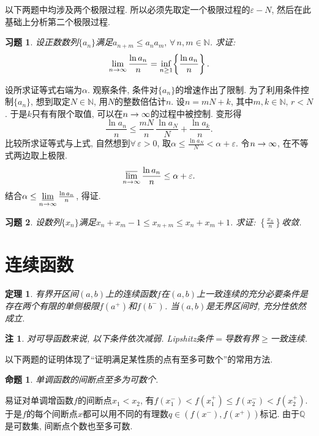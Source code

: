 \documentclass[11pt,a4paper]{ctexart}
\makeatletter
\theoremstyle{thmseries} %
\newtheorem{thm}{定理}[section]
\newtheorem{prop}{命题}[section]
\theoremstyle{exerseries}
\newtheorem{exer}{习题}[section]
\newtheorem*{rem}{注}
\renewenvironment{proof}[1][\proofname]{\par
  \pushQED{\qed}%
  \normalfont \topsep6\p@\@plus6\p@\relax
  \trivlist
  \item[\hskip\labelsep
        \itshape
    #1\@addpunct{}]\ignorespaces
}{%
  \popQED\endtrivlist\@endpefalse
}
\newenvironment{pf}{\begin{proof}[\bfseries\upshape 证\quad]}{\end{proof}}
\newcommand{\bra}[1]{\mathopen{}\left(#1\right)}
\newcommand{\cbra}[1]{\mathopen{}\left\{#1\right\}}
\renewcommand{\epsilon}{\varepsilon}
\newcommand{\N}{\mathbb{N}}
\newcommand{\Q}{\mathbb{Q}}
\DeclareMathOperator{\llim}{\underset{\nti}{\underline{\lim}}}
\DeclareMathOperator{\ulim}{\underset{\nti}{\overline{\lim}}}
\def \nti {\mathnormal{n}\to\infty}
\makeatother
\begin{document}
以下两题中均涉及两个极限过程. 所以必须先取定一个极限过程的$\epsilon-N$, 然后在此基础上分析第二个极限过程. 
\begin{exer}
	设正数数列$\{a_n\}$满足$a_{n+m}\leq a_na_m,\,\forall\,n,m\in\N$. 求证:
	\[\lim_{\nti}\frac{\ln a_n}{n}=\inf_{n\geq 1}\cbra{\frac{\ln a_n}{n}}.\]
\end{exer}
\begin{pf}
	设所求证等式右端为$\alpha$. 观察条件, 条件对$\{a_n\}$的增速作出了限制. 为了利用条件控制$\{a_n\}$, 想到取定$N\in\N$, 用$N$的整数倍估计$n$. 设$n=mN+k$, 其中$m,k\in\N,\,r<N$. 于是$k$只有有限个取值, 可以在$\nti$的过程中被控制. 变形得
	\[\frac{\ln a_n}{n}\leq\frac{mN}{n}\,\frac{\ln a_N}{N}+\frac{\ln a_k}{n}.\]
	比较所求证等式与上式, 自然想到$\forall\,\epsilon>0$, 取$\alpha\leq\frac{\ln a_N}{N}<\alpha+\epsilon.$
	令$\nti$, 在不等式两边取上极限. 
	\[\ulim\frac{\ln a_n}{n}\leq\alpha+\epsilon.\]
	结合$\alpha\leq\llim\frac{\ln a_n}{n}$, 得证. 
\end{pf}

\begin{exer}
	设数列$\{x_n\}$满足$x_n+x_m-1\leq x_{n+m}\leq x_n+x_m+1$. 求证: $\cbra{\frac{x_n}{n}}$收敛. 
\end{exer}


\section{连续函数}
\begin{thm}
	有界开区间$(a,b)$上的连续函数$f$在$(a,b)$上一致连续的充分必要条件是存在两个有限的单侧极限$f(a^+)$和$f(b^-)$. 当$(a,b)$是无界区间时, 充分性依然成立. 
\end{thm}
\begin{rem}
	对可导函数来说, 以下条件依次减弱. Lipshitz条件$=$导数有界$\geq$一致连续. 
\end{rem}


以下两题的证明体现了``证明满足某性质的点有至多可数个''的常用方法. 
\begin{prop}
	单调函数的间断点至多为可数个. 
\end{prop}
\begin{pf}
	易证对单调增函数$f$的间断点$x_1<x_2$, 有$f(x_1^-)<f(x_1^+)\leq f(x_2^-)<f(x_2^+)$. 于是$f$的每个间断点$x$都可以用不同的有理数$q\in\bra{f(x^-),f(x^+)}$标记. 由于$\Q$是可数集, 间断点个数也至多可数. 
\end{pf}
\end{document}
